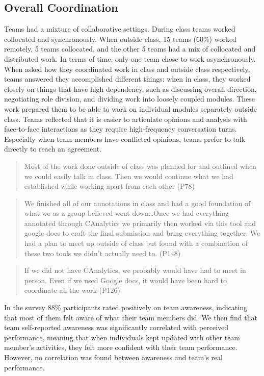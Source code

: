 \subsection{Overall Coordination}

Teams had a mixture of collaborative settings. During class teams worked collocated and synchronously. When outside class, 15 teams (60\%) worked remotely, 5 teams collocated, and the other 5 teams had a mix of collocated and distributed work. In terms of time, only one team chose to work asynchronously. When asked how they coordinated work in class and outside class respectively, teams answered they accomplished different things: when in class, they worked closely on things that have high dependency, such as discussing overall direction, negotiating role division, and dividing work into loosely coupled modules. These work prepared them to be able to work on individual modules separately outside class. Teams reflected that it is easier to articulate opinions and analysis with face-to-face interactions as they require high-frequency conversation turns. Especially when team members have conflicted opinions, teams prefer to talk directly to reach an agreement. 

\begin{quote}
	Most of the work done outside of class was planned for and outlined when we could easily talk in class. Then we would continue what we had established while working apart from each other (P78)
\end{quote}

\begin{quote}
	We finished all of our annotations in class and had a good foundation of what we as a group believed went down…Once we had everything annotated through CAnalytics we primarily then worked via this tool and google docs to craft the final submission and bring everything together. We had a plan to meet up outside of class but found with a combination of these two tools we didn’t actually need to. (P148)
\end{quote}

\begin{quote}
	If we did not have CAnalytics, we probably would have had to meet in person. Even if we used Google docs, it would have been hard to coordinate all the work (P126)
\end{quote}


In the survey 88\% participants rated positively on team awareness, indicating that most of them felt aware of what their team members did. We then find that team self-reported awareness was significantly correlated with perceived performance, meaning that when individuals kept updated with other team member's activities, they felt more confident with their team performance. However, no correlation was found between awareness and team's real performance. 

